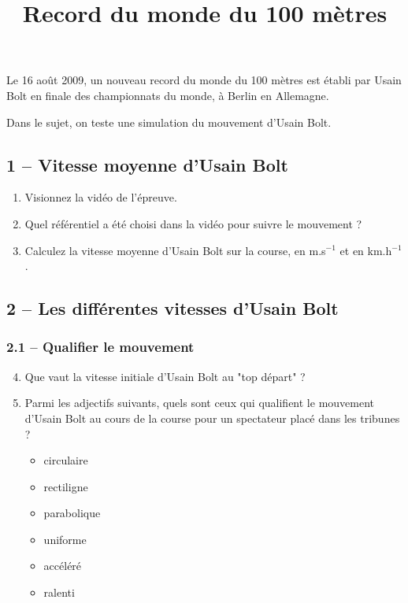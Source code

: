 \documentclass[11pt]{article}
\title{Record du monde du 100 mètres}\author{}\date{}
\begin{document}
\maketitle
\thispagestyle{fancy}

\vspace{-1cm}
Le 16 août 2009, un nouveau record du monde du 100 mètres est établi par Usain Bolt en finale des championnats du monde, à Berlin en Allemagne.

Dans le sujet, on teste une simulation du mouvement d'Usain Bolt.



\subsection*{1 -- Vitesse moyenne d'Usain Bolt}

\begin{enumerate}
 \item Visionnez la vidéo de l'épreuve.
 
 \smallskip
 \item \ar Quel référentiel a été choisi dans la vidéo pour suivre le mouvement ?
 
 \medskip
 
 \item \rea Calculez la vitesse moyenne d'Usain Bolt sur la course, en m.s$^{-1}$ et en km.h$^{-1}$. 
\end{enumerate}


\subsection*{2 -- Les différentes vitesses d'Usain Bolt}

\subsubsection*{2.1 -- Qualifier le mouvement}

\begin{enumerate}
 \setcounter{enumi}{3}
 \item \app Que vaut la vitesse initiale d'Usain Bolt au "top départ" ?
 
 
 \medskip
 \item \rco Parmi les adjectifs suivants, quels sont ceux qui qualifient le mouvement d'Usain Bolt au cours de la course pour un spectateur placé dans les tribunes ? 
 
 
 \begin{multicols}{6}
 \begin{itemize}
  \item circulaire
  \item rectiligne
  \item parabolique
  \item uniforme
  \item accéléré
  \item ralenti
 \end{itemize}
\end{multicols}
 
 \end{enumerate}
 
\end{document}
